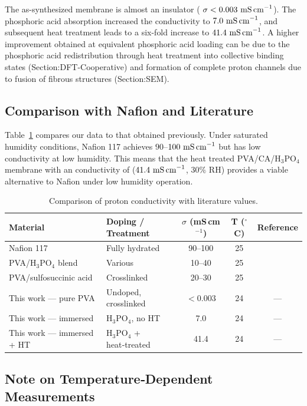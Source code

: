 \documentclass[12pt,a4paper]{report}
\begin{document}
The as-synthesized membrane is almost an insulator ( $\sigma <0.003\ \text{mS\,cm}^{-1}$). The phosphoric acid absorption increased the conductivity to $7.0\ \text{mS\,cm}^{-1}$, and subsequent heat treatment leads to a six-fold increase to $41.4\ \text{mS\,cm}^{-1}$. A higher improvement obtained at equivalent phosphoric acid loading can be due to the phosphoric acid redistribution through heat treatment into collective binding states (Section:DFT-Cooperative) and formation of complete proton channels due to fusion of fibrous structures (Section:SEM).

\subsection{Comparison with Nafion and Literature}

Table~\ref{tab:conductivity-comparison} compares our data to that obtained previously. 
Under saturated humidity conditions, Nafion 117 achieves $90$--$100\ \text{mS\,cm}^{-1}$ but has low conductivity at low humidity. This means that the heat treated PVA/CA/H$_{3}$PO$_{4}$  membrane with an conductivity 
of ($41.4\ \text{mS\,cm}^{-1}$, $30\%$ RH) provides a viable alternative to Nafion under low humidity operation.

\begin{table}[h!]
\centering
\caption{Comparison of proton conductivity with literature values.}
\label{tab:conductivity-comparison}
\begin{tabular}{l l c c c}
\hline
Material & Doping / Treatment & $\sigma$ (mS\,cm$^{-1}$) & 
T ($^{\circ}$C) & Reference \\
\hline
Nafion 117 & Fully hydrated & 90--100 & 25 & \cite{5,6} \\
PVA/H$_{3}$PO$_{4}$ blend & Various & 10--40 & 25 & \cite{57,58} \\
PVA/sulfosuccinic acid & Crosslinked & 20--30 & 25 & \cite{113} \\
\hline
This work --- pure PVA & Undoped, crosslinked & ${<}0.003$ & 24 & --- \\
This work --- immersed & H$_{3}$PO$_{4}$, no HT & 7.0 & 24 & --- \\
This work --- immersed + HT & H$_{3}$PO$_{4}$ + heat‑treated & 41.4 & 24 & --- \\
\hline
\end{tabular}
\end{table}

\subsection{Note on Temperature‑Dependent Measurements}
\end{document}
